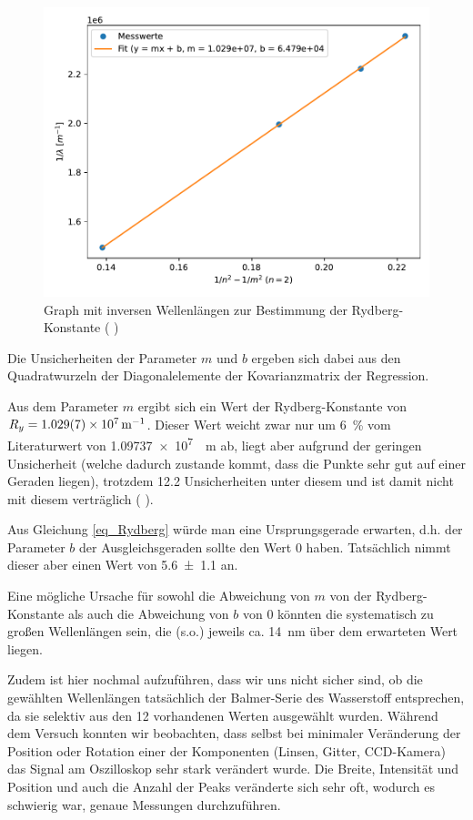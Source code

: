 \documentclass{article}
\newcommand{\coderef}[1]{%
    \text{\footnotesize \colorbox{codebg}{\texttt{#1()}}}%
}
\begin{document}
\begin{figure}[H]
    \centering
    \includegraphics[width=0.7\linewidth]{Abbildungen/Graph_TV1.pdf}
    \caption{Graph mit inversen Wellenlängen zur Bestimmung der Rydberg-Konstante
    (\coderef{tv1})}
    \label{Graph_TV1}
\end{figure}

Die Unsicherheiten der Parameter $m$ und $b$ ergeben sich dabei
aus den Quadratwurzeln der Diagonalelemente der Kovarianzmatrix der Regression.

Aus dem Parameter $m$ ergibt sich ein Wert der Rydberg-Konstante von
$R_y = \qty{1.029 \pm 0.007 e7}{\per\meter}$.
Dieser Wert weicht zwar nur um \qty{6}{\percent} vom Literaturwert
von \qty{1.09737e7}{\per\meter} ab, liegt aber aufgrund der geringen Unsicherheit
(welche dadurch zustande kommt, dass die Punkte sehr gut auf einer Geraden liegen),
trotzdem \num{12.2} Unsicherheiten unter diesem und ist damit nicht mit diesem
verträglich (\coderef{tv1}).

Aus Gleichung \ref{eq_Rydberg} würde man eine Ursprungsgerade erwarten, d.h.
der Parameter $b$ der Ausgleichsgeraden sollte den Wert $0$ haben.
Tatsächlich nimmt dieser aber einen Wert von \num{5.6 \pm 1.1} an.

Eine mögliche Ursache für sowohl die Abweichung von $m$ von der Rydberg-Konstante
als auch die Abweichung von $b$ von $0$ könnten die systematisch zu großen
Wellenlängen sein, die (s.o.) jeweils ca. \qty{14}{\nm} über dem erwarteten
Wert liegen.

Zudem ist hier nochmal aufzuführen, dass wir uns nicht sicher sind, ob die gewählten
Wellenlängen tatsächlich der Balmer-Serie des Wasserstoff entsprechen,
da sie selektiv aus den 12 vorhandenen Werten ausgewählt wurden.
Während dem Versuch konnten wir beobachten, dass selbst bei minimaler
Veränderung der Position oder Rotation einer der Komponenten (Linsen, Gitter,
CCD-Kamera) das Signal am Oszilloskop sehr stark verändert wurde. Die Breite,
Intensität und Position und auch die Anzahl der Peaks veränderte sich
sehr oft, wodurch es schwierig war, genaue Messungen durchzuführen.
\end{document}
